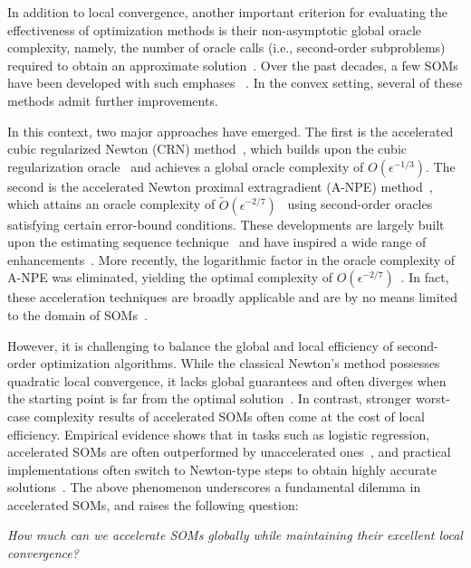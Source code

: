 \documentclass{article}
\numberwithin{equation}{section}
\numberwithin{equation}{section}
\begin{document}
In addition to local convergence, another important criterion for evaluating the effectiveness of optimization methods is their non-asymptotic global oracle complexity, namely, the number of oracle calls (i.e., second-order subproblems) required to obtain an approximate solution~\cite{cartis2022evaluation}.  Over the past decades, a few SOMs have been developed with such emphases ~\cite{nesterov2006cubic,mishchenko2023regularized,jiang2026beyond,he2025homogeneous,curtis2021trust,he2023newton,cartis2011adaptive,cartis2011adaptive_i,curtis2017trust}.
In the convex setting, several of these methods admit further improvements.

In this context, two major approaches have emerged. The first is the accelerated cubic regularized Newton (CRN) method~\cite{nesterov2008accelerating}, which builds upon the cubic regularization oracle~\cite{nesterov2006cubic} and achieves a global oracle complexity of $O(\epsilon^{-1/3})$.
The second is the accelerated Newton proximal extragradient (A-NPE) method~\cite{monteiro2013accelerated}, which attains an oracle complexity of $\tilde{O}(\epsilon^{-2/7})$~ using second-order oracles satisfying certain error-bound conditions.
These developments are largely built upon the estimating sequence technique~\cite{nesterov1983method,baes2009estimate} and have inspired a wide range of enhancements~\cite{jiang2021optimal,chen2022accelerating,lin2022explicit,agafonov2023inexact,agafonov2024advancing,jiang2024accelerated,huang2024inexact,doikov2020contracting}.
More recently, the logarithmic factor in the oracle complexity of A-NPE was eliminated, yielding the optimal complexity of $O(\epsilon^{-2/7})$~\cite{carmon2022optimal,kovalev2022first}. In fact, these acceleration techniques are broadly applicable and are by no means limited to the domain of SOMs~\cite{xu2017accelerated,xu2018accelerated,lan2012optimal,ghadimi2016accelerated}.


However, it is challenging to balance the global and local efficiency of second-order optimization algorithms. While the classical Newton's method possesses quadratic local convergence, it lacks global guarantees and often diverges when the starting point is far from the optimal solution~\cite{more1982newton,dennisjr1996numerical}. In contrast, stronger worst-case complexity results of accelerated SOMs often come at the cost of local efficiency.
Empirical evidence shows that in tasks such as logistic regression, accelerated SOMs are often outperformed by unaccelerated ones~\cite{jiang2020unified,huang2024inexact,chen2022accelerating,carmon2022optimal}, and practical implementations often switch to Newton-type steps to obtain highly accurate solutions~\cite{jiang2020unified,huang2024inexact,chen2022accelerating}. The above phenomenon underscores a fundamental dilemma in accelerated SOMs, and raises the following question:
\begin{center}
    \emph{How much can we accelerate SOMs globally while maintaining their excellent local convergence?}
\end{center}
\end{document}
